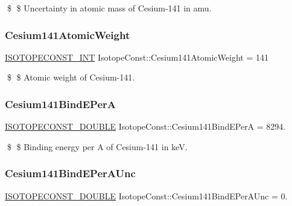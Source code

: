 \$ \$ Uncertainty in atomic mass of Cesium-\/141 in amu. \mbox{\label{group___isotope_const-_cesium-_cs141_ga9388f9b23b23d38da663c9b44bcb4281}} 
\subsubsection{\texorpdfstring{Cesium141\+Atomic\+Weight}{Cesium141AtomicWeight}}
{\footnotesize\ttfamily \mbox{\hyperlink{group___isotope_const-_macros_ga5f18360b3e99483a35c32d789e62621c}{I\+S\+O\+T\+O\+P\+E\+C\+O\+N\+S\+T\+\_\+\+I\+NT}} Isotope\+Const\+::\+Cesium141\+Atomic\+Weight = 141}

\$ \$ Atomic weight of Cesium-\/141. \mbox{\label{group___isotope_const-_cesium-_cs141_ga1e3cce350283ce5b87bf91e69a224aae}} 
\subsubsection{\texorpdfstring{Cesium141\+Bind\+E\+PerA}{Cesium141BindEPerA}}
{\footnotesize\ttfamily \mbox{\hyperlink{group___isotope_const-_macros_ga8f45a7272ce02c0b4c65c44636ed719a}{I\+S\+O\+T\+O\+P\+E\+C\+O\+N\+S\+T\+\_\+\+D\+O\+U\+B\+LE}} Isotope\+Const\+::\+Cesium141\+Bind\+E\+PerA = 8294.}

\$ \$ Binding energy per A of Cesium-\/141 in keV. \mbox{\label{group___isotope_const-_cesium-_cs141_ga496d416716a02af5a4814e257123e267}} 
\subsubsection{\texorpdfstring{Cesium141\+Bind\+E\+Per\+A\+Unc}{Cesium141BindEPerAUnc}}
{\footnotesize\ttfamily \mbox{\hyperlink{group___isotope_const-_macros_ga8f45a7272ce02c0b4c65c44636ed719a}{I\+S\+O\+T\+O\+P\+E\+C\+O\+N\+S\+T\+\_\+\+D\+O\+U\+B\+LE}} Isotope\+Const\+::\+Cesium141\+Bind\+E\+Per\+A\+Unc = 0.}

